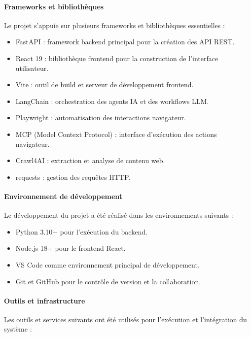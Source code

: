 \paragraph{Frameworks et bibliothèques}

Le projet s’appuie sur plusieurs frameworks et bibliothèques essentielles :

\begin{itemize}
    \item FastAPI : framework backend principal pour la création des API REST.
    \item React 19 : bibliothèque frontend pour la construction de l’interface utilisateur.
    \item Vite : outil de build et serveur de développement frontend.
    \item LangChain  : orchestration des agents IA et des workflows LLM.
    \item Playwright : automatisation des interactions navigateur.
    \item MCP (Model Context Protocol) : interface d’exécution des actions navigateur.
    \item Crawl4AI : extraction et analyse de contenu web.
    \item requests : gestion des requêtes HTTP.
\end{itemize}

\paragraph{Environnement de développement}

Le développement du projet a été réalisé dans les environnements suivants :

\begin{itemize}
    \item Python 3.10+ pour l’exécution du backend.
    \item Node.js 18+ pour le frontend React.
    \item VS Code comme environnement principal de développement.
    \item Git et GitHub pour le contrôle de version et la collaboration.
\end{itemize}

\paragraph{Outils et infrastructure}

Les outils et services suivants ont été utilisés pour l’exécution et l’intégration du système :

